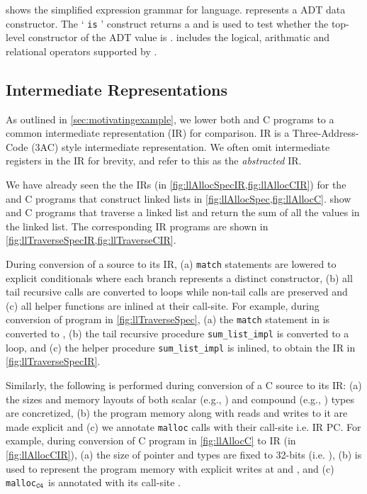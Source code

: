 

 shows the simplified expression grammar for \SpecL{} language.
 represents a ADT data constructor.
The ` {\tt is} ' construct returns a  and is used to test whether the top-level constructor
of the ADT value  is .
 includes the logical, arithmatic and relational operators supported by \SpecL{}.

\subsection{Intermediate Representations}
\label{sec:ir}
As outlined in \cref{sec:motivatingexample}, we lower both \SpecL{} and C programs to a common
intermediate representation (IR) for comparison.
IR is a Three-Address-Code (3AC) style intermediate representation.
We often omit intermediate registers in the IR for brevity,
and refer to this as the {\em abstracted} IR.




We have already seen the the IRs (in \cref{fig:llAllocSpecIR,fig:llAllocCIR}) for the \SpecL{} and C programs
that construct linked lists in \cref{fig:llAllocSpec,fig:llAllocC}.
 show \SpecL{} and C programs that traverse a linked list
and return the sum of all the values in the linked list.
The corresponding IR programs are shown in \cref{fig:llTraverseSpecIR,fig:llTraverseCIR}.

During conversion of a \SpecL{} source to its IR,
(a) {\tt match} statements are lowered to explicit \sumDtor{} conditionals where each branch
represents a distinct constructor,
(b) all tail recursive calls are converted to loops while non-tail calls are preserved and
(c) all helper functions are inlined at their call-site.
For example, during conversion of \SpecL{} program in \cref{fig:llTraverseSpec},
(a) the {\tt match} statement in  is converted to \sumDtor{},
(b) the tail recursive procedure {\tt sum\_list\_impl} is converted to a loop,
and (c) the helper procedure {\tt sum\_list\_impl} is inlined,
to obtain the IR in \cref{fig:llTraverseSpecIR}.

Similarly, the following is performed during conversion of a C source to its IR:
(a) the sizes and memory layouts of both scalar (e.g., )
and compound (e.g., ) types are concretized,
(b) the program memory along with reads and writes to it are made explicit and
(c) we annotate {\tt malloc} calls with their call-site i.e. IR PC.
For example, during conversion of C program in \cref{fig:llAllocC} to IR (in \cref{fig:llAllocCIR}),
(a) the size of pointer and  types are fixed to 32-bits (i.e. ),
(b) \mem{} is used to represent the program memory with explicit writes at  and ,
and (c) {\tt malloc$_{{\tt C4}}$} is annotated with its call-site .

